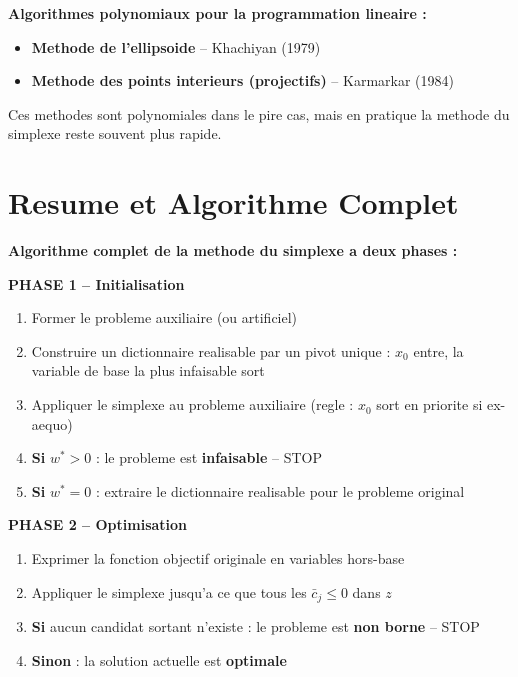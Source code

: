 \documentclass[12pt,a4paper]{article}
\begin{document}
\begin{important}
\textbf{Algorithmes polynomiaux pour la programmation lineaire :}

\begin{itemize}
    \item \textcolor{titrebleu}{\textbf{Methode de l'ellipsoide}} -- Khachiyan (1979)
    \item \textcolor{defvert}{\textbf{Methode des points interieurs (projectifs)}} -- Karmarkar (1984)
\end{itemize}

Ces methodes sont polynomiales dans le pire cas, mais en pratique la methode du simplexe reste souvent plus rapide.
\end{important}

\section{Resume et Algorithme Complet}

\begin{important}
\textbf{Algorithme complet de la methode du simplexe a deux phases :}

\textbf{\textcolor{titrebleu}{PHASE 1 -- Initialisation}}
\begin{enumerate}
    \item Former le probleme auxiliaire (ou artificiel)
    \item Construire un dictionnaire realisable par un pivot unique : $x_0$ entre, la variable de base la plus infaisable sort
    \item Appliquer le simplexe au probleme auxiliaire (regle : $x_0$ sort en priorite si ex-aequo)
    \item \textbf{Si} $w^* > 0$ : le probleme est \textcolor{importantrouge}{\textbf{infaisable}} -- STOP
    \item \textbf{Si} $w^* = 0$ : extraire le dictionnaire realisable pour le probleme original
\end{enumerate}

\textbf{\textcolor{defvert}{PHASE 2 -- Optimisation}}
\begin{enumerate}
    \item Exprimer la fonction objectif originale en variables hors-base
    \item Appliquer le simplexe jusqu'a ce que tous les $\bar{c}_j \leq 0$ dans $z$
    \item \textbf{Si} aucun candidat sortant n'existe : le probleme est \textcolor{importantrouge}{\textbf{non borne}} -- STOP
    \item \textbf{Sinon} : la solution actuelle est \textcolor{defvert}{\textbf{optimale}}
\end{enumerate}
\end{important}
\end{document}
